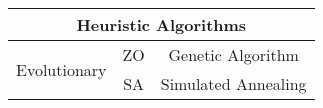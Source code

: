 \documentclass[twoside,a4paper,10pt]{article}
\begin{document}
\begin{tabular}{|p{3cm}|c|c|}
\hline
\multicolumn{3}{|c|}{Heuristic Algorithms} \\
\hline
\multirow{2}{*}{Evolutionary} & ZO & Genetic Algorithm\\ 
                              & SA & Simulated Annealing \\ 
\hline
\end{tabular}
\end{document}

